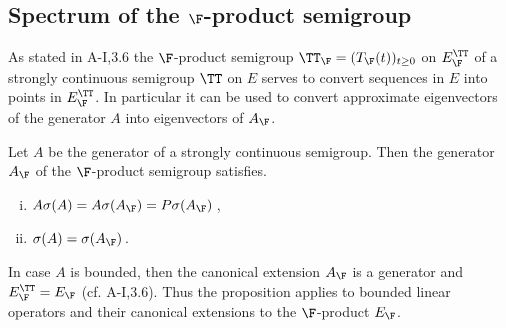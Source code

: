 \subsection{Spectrum of the $\F$-product semigroup}\label{subsec:a3-4.5}
%
As stated in A-I,3.6 the $\F$-product semigroup $\TT_{\F} = (T_{\F}(t))_{t \geq 0}$ on $E_{\F}^{\TT}$ of a strongly continuous semigroup $\TT$ on $E$ serves to convert sequences in $E$ into points in $E_{\F}^{\TT}$.
In particular it can be used to convert approximate eigenvectors of the generator $A$ into eigenvectors of $A_{\F}$.
\begin{proposition}\label{prop:a3-4.4}
Let $A$ be the generator of a strongly continuous semigroup. Then the generator $A_{\F}$ of the $\F$-product semigroup satisfies.
\begin{enumerate}[(i)]
\item 
	$A\sigma(A) = A\sigma(A_{\F}) = P\sigma(A_{\F})$\,,

\item 
	$\sigma(A) = \sigma(A_{\F})$\,.
\end{enumerate}
\end{proposition}
\begin{remark}
In case $A$ is bounded, then the canonical extension $A_{\F}$ is a generator and $E_{\F}^{\TT} = E_{\F}$ (cf. A-I,3.6).
Thus the proposition applies to bounded linear operators and their canonical extensions to the 
$\F$-product $E_{\F}$.
\end{remark}
